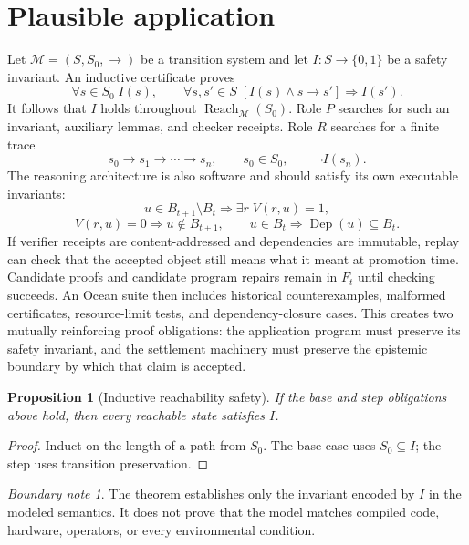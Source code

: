 \documentclass[11pt,oneside]{book}
\newtheorem{proposition}[theorem]{Proposition}
\theoremstyle{definition}
\theoremstyle{remark}
\newtheorem{boundary}[theorem]{Boundary note}
\newcommand{\Reach}{\operatorname{Reach}}
\newcommand{\Dep}{\operatorname{Dep}}
\begin{document}
\section{Plausible application}
Let \(\mathcal M=(S,S_0,\to)\) be a transition system and let \(I:S\to\{0,1\}\) be a safety
invariant. An inductive certificate proves
\[
\forall s\in S_0\;I(s),
\qquad
\forall s,s'\in S\;[I(s)\land s\to s']\Rightarrow I(s').
\]
It follows that \(I\) holds throughout \(\Reach_{\mathcal M}(S_0)\). Role \(P\) searches for such an
invariant, auxiliary lemmas, and checker receipts. Role \(R\) searches for a finite trace
\[
s_0\to s_1\to\cdots\to s_n,
\qquad s_0\in S_0,
\qquad \neg I(s_n).
\]
The reasoning architecture is also software and should satisfy its own executable invariants:
\[
u\in B_{t+1}\setminus B_t
\Rightarrow\exists r\;V(r,u)=1,
\]
\[
V(r,u)=0\Rightarrow u\notin B_{t+1},
\qquad
u\in B_t\Rightarrow\Dep(u)\subseteq B_t.
\]
If verifier receipts are content-addressed and dependencies are immutable, replay can check that
the accepted object still means what it meant at promotion time. Candidate proofs and candidate
program repairs remain in \(F_t\) until checking succeeds. An Ocean suite then includes historical
counterexamples, malformed certificates, resource-limit tests, and dependency-closure cases. This
creates two mutually reinforcing proof obligations: the application program must preserve its safety
invariant, and the settlement machinery must preserve the epistemic boundary by which that claim is
accepted.

\begin{proposition}[Inductive reachability safety]
If the base and step obligations above hold, then every reachable state satisfies \(I\).
\end{proposition}

\begin{proof}
Induct on the length of a path from \(S_0\). The base case uses \(S_0\subseteq I\); the step uses
transition preservation.
\end{proof}

\begin{boundary}
The theorem establishes only the invariant encoded by \(I\) in the modeled semantics. It does not
prove that the model matches compiled code, hardware, operators, or every environmental condition.
\end{boundary}
\end{document}

